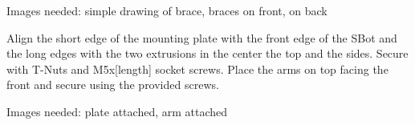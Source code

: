 \begin{tipbox}
    Images needed: simple drawing of brace, braces on front, on back
\end{tipbox}

Align the short edge of the mounting plate with the front edge of the SBot and the long edges with the two extrusions in the center the top and the sides. Secure with T-Nuts and M5x[length] socket screws. Place the arms on top facing the front and secure using the provided screws.

\begin{tipbox}
    Images needed: plate attached, arm attached
\end{tipbox}

